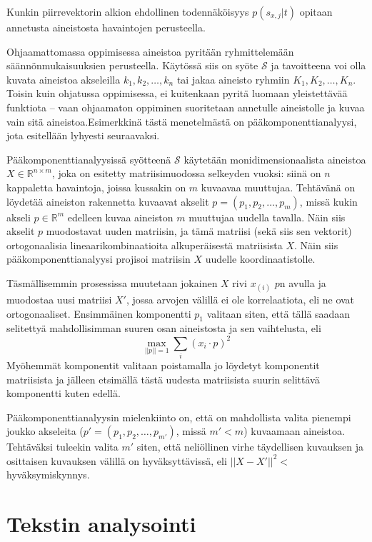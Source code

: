 \documentclass[finnish,gradu,twoside,12pt]{tktltiki}
\begin{document}
{Kunkin piirrevektorin alkion ehdollinen todennäköisyys $p( s_{x,j} | t)$ opitaan annetusta aineistosta havaintojen perusteella.

Ohjaamattomassa oppimisessa aineistoa pyritään ryhmittelemään säännönmukaisuuksien perusteella. Käytössä siis on syöte $\mathcal{S}$ ja tavoitteena voi olla kuvata aineistoa akseleilla $k_1, k_2, \ldots , k_n$ tai jakaa aineisto ryhmiin $K_1, K_2, \ldots, K_n$. Toisin kuin ohjatussa oppimisessa, ei kuitenkaan pyritä luomaan yleistettävää funktiota -- vaan ohjaamaton oppiminen suoritetaan annetulle aineistolle ja kuvaa vain sitä aineistoa.Esimerkkinä tästä menetelmästä on pääkomponenttianalyysi, jota esitellään lyhyesti seuraavaksi.

Pääkomponenttianalyysissä syötteenä $\mathcal{S}$ käytetään monidimensionaalista aineistoa $X \in \mathbb{R}^{ n \times m}$, joka on esitetty matriisimuodossa selkeyden vuoksi: siinä on $n$ kappaletta havaintoja, joissa kussakin on $m$ kuvaavaa muuttujaa. Tehtävänä on löydetää aineiston rakennetta kuvaavat akselit $p = ( p_1, p_2, \ldots, p_m )$, missä kukin akseli $p \in \mathbb{R}^m$ edelleen kuvaa aineiston $m$  muuttujaa uudella tavalla. Näin siis akselit $p$ muodostavat uuden matriisin, ja tämä matriisi (sekä siis sen vektorit) ortogonaalisia lineaarikombinaatioita alkuperäisestä matriisista $X$. Näin siis pääkomponenttianalyysi projisoi matriisin $X$ uudelle koordinaatistolle.

Täsmällisemmin prosessissa muutetaan jokainen $X$ rivi $x_(i)$ $p$n avulla ja muodostaa uusi matriisi $X'$, jossa arvojen välillä ei ole korrelaatiota, eli ne ovat ortogonaaliset. Ensimmäinen komponentti $p_1$ valitaan siten, että tällä saadaan selitettyä mahdollisimman suuren osan aineistosta ja sen vaihtelusta, eli $$\max_{||p||=1} \sum_i (x_i \cdot p )^2$$ Myöhemmät komponentit valitaan poistamalla jo löydetyt komponentit matriisista ja jälleen etsimällä tästä uudesta matriisista suurin selittävä  komponentti kuten edellä.

Pääkomponenttianalyysin mielenkiinto on, että on mahdollista valita pienempi joukko akseleita ($p' = (p_1, p_2, \ldots, p_{m'})$, missä $m' < m$) kuvaamaan aineistoa. Tehtäväksi tuleekin valita $m'$ siten, että neliöllinen virhe täydellisen kuvauksen ja osittaisen kuvauksen välillä on hyväksyttävissä, eli $||X-X'||^2 < $ hyväksymiskynnys.

\section{Tekstin analysointi}
\label{sec:textanalysis}

}
\end{document}
